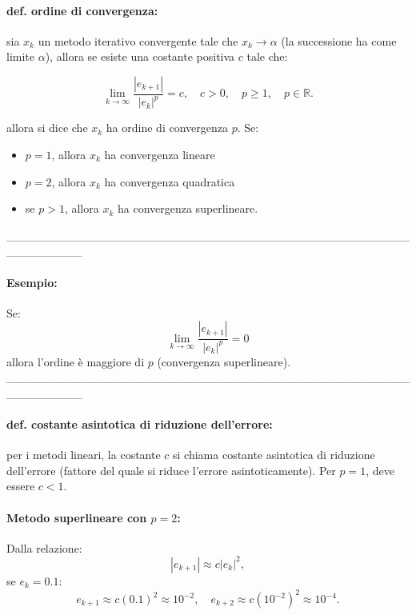 \documentclass[a4paper, 11pt]{article}
\begin{document}
        \paragraph{def. ordine di convergenza:}
        sia $x_k$ un metodo iterativo convergente tale che \( x_k \to \alpha \) (la successione ha come limite \( \alpha \)), allora se esiste una costante positiva \( c \) tale che:

        \[
            \lim_{k \to \infty} \frac{|e_{k+1}|}{|e_k|^p} = c, \quad c > 0, \quad p \geq 1, \quad p \in \mathbb{R}.
        \] 
        
        allora si dice che $x_k$ ha ordine di convergenza \( p \). Se:
        
        \begin{itemize}
            \item \( p = 1 \), allora $x_k$ ha convergenza lineare
            \item \( p = 2 \), allora $x_k$ ha convergenza quadratica
            \item se \( p > 1 \), allora $x_k$ ha convergenza superlineare.
        \end{itemize}
_________________________________________________________
        \paragraph{Esempio:}
        Se:
        \[
            \lim_{k \to \infty} \frac{|e_{k+1}|}{|e_k|^p} = 0
        \]
        allora l'ordine è maggiore di \( p \) (convergenza superlineare).
_________________________________________________________

        \paragraph{def. costante asintotica di riduzione dell'errore:} per i metodi lineari, la costante \( c \) si chiama costante asintotica di riduzione dell'errore (fattore del quale si riduce l'errore asintoticamente). Per \( p = 1 \), deve essere \( c < 1 \).

        \paragraph{Metodo superlineare con \( p = 2 \):}
        Dalla relazione:
        \[
        |e_{k+1}| \approx c |e_k|^2,
        \]
        se \( e_k = 0.1 \):
        \[
        e_{k+1} \approx c (0.1)^2 \approx 10^{-2}, \quad e_{k+2} \approx c (10^{-2})^2 \approx 10^{-4}.
        \]
\end{document}
